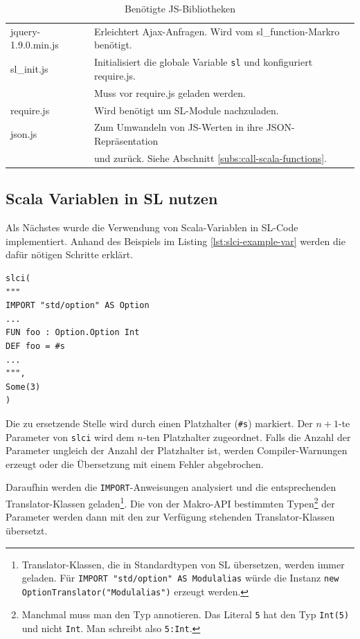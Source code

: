 \documentclass[12pt,bibtotoc]{scrreprt}
\begin{document}
\begin{table}[h]
\caption{Benötigte JS-Bibliotheken}
\centering
\begin{tabular}{ll}
jquery-1.9.0.min.js & Erleichtert Ajax-Anfragen. Wird vom sl\_function-Markro benötigt\cite{JQuery1}.\\
sl\_init.js         & Initialisiert die globale Variable \lstinline!sl! und konfiguriert require.js. \\
                    & Muss vor require.js geladen werden.\\
require.js          & Wird benötigt um SL-Module nachzuladen\cite{RequireJS1}.\\
json.js             & Zum Umwandeln von JS-Werten in ihre JSON-Repräsentation \\
                    & und zurück. Siehe Abschnitt \ref{subs:call-scala-functions}\cite{Crockford2010}.\\
\end{tabular}
\label{tab:js-libraries}
\end{table}

\subsection{Scala Variablen in SL nutzen}

Als Nächstes wurde die Verwendung von Scala-Variablen in \ac{SL}-Code implementiert. Anhand des Beispiels im Listing \ref{lst:slci-example-var} werden die dafür nötigen Schritte erklärt.

\begin{lstlisting}[caption={Beispielaufruf des slci-Macros mit Scala Variablen}, label=lst:slci-example-var, float=h]
slci(
"""
IMPORT "std/option" AS Option 
...
FUN foo : Option.Option Int
DEF foo = #s
...
""",
Some(3)
)
\end{lstlisting}

Die zu ersetzende Stelle wird durch einen Platzhalter (\lstinline!#s!) markiert. Der $n+1$-te Parameter von \lstinline!slci! wird dem $n$-ten Platzhalter zugeordnet. Falls die Anzahl der Parameter ungleich der Anzahl der Platzhalter ist, werden Compiler-Warnungen erzeugt oder die Übersetzung mit einem Fehler abgebrochen. 

Daraufhin werden die \lstinline!IMPORT!-Anweisungen analysiert und die entsprechenden Translator-Klassen geladen\footnote{Translator-Klassen, die in Standardtypen von SL übersetzen, werden immer geladen. Für \lstinline!IMPORT "std/option" AS Modulalias! würde die Instanz \lstinline!new OptionTranslator("Modulalias")! erzeugt werden.}.  Die von der Makro-API bestimmten Typen\footnote{Manchmal muss man den Typ annotieren. Das Literal \lstinline!5! hat den Typ \lstinline!Int(5)! und nicht \lstinline!Int!. Man schreibt also \lstinline!5:Int!.} der Parameter werden dann mit den zur Verfügung stehenden Translator-Klassen übersetzt.
\end{document}
